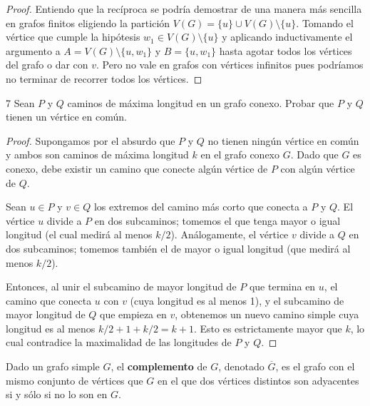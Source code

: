 \begin{proof}
    \vspace{0.1cm}

    Entiendo que la recíproca se podría demostrar de una manera más sencilla en grafos finitos eligiendo la partición \( V(G) = \{ u \} \cup V(G) \setminus \{ u \} \). Tomando el vértice que cumple la hipótesis \( w_1 \in V(G) \setminus \{ u \} \) y aplicando inductivamente el argumento a \( A = V(G) \setminus \{ u, w_1 \} \) y \( B = \{ u, w_1\} \) hasta agotar todos los vértices del grafo o dar con \( v \). Pero no vale en grafos con vértices infinitos pues podríamos no terminar de recorrer todos los vértices.
\end{proof}

\vspace{0.5cm}

\begin{ejercicio}{7}
    Sean \( P \) y \( Q \) caminos de máxima longitud en un grafo conexo. Probar que \( P \) y \( Q \) tienen un vértice en común.
\end{ejercicio}
\begin{proof}
    Supongamos por el absurdo que \( P \) y \( Q \) no tienen ningún vértice en común y ambos son caminos de máxima longitud \( k \) en el grafo conexo \( G \). Dado que \( G \) es conexo, debe existir un camino que conecte algún vértice de \( P \) con algún vértice de \( Q \).

    Sean \( u \in P \) y \( v \in Q \) los extremos del camino más corto que conecta a \( P \) y \( Q \). El vértice \( u \) divide a \( P \) en dos subcaminos; tomemos el que tenga mayor o igual longitud (el cual medirá al menos \( k/2 \)). Análogamente, el vértice \( v \) divide a \( Q \) en dos subcaminos; tomemos también el de mayor o igual longitud (que medirá al menos \( k/2 \)).

    Entonces, al unir el subcamino de mayor longitud de \( P \) que termina en \( u \), el camino que conecta \( u \) con \( v \) (cuya longitud es al menos 1), y el subcamino de mayor longitud de \( Q \) que empieza en \( v \), obtenemos un nuevo camino simple cuya longitud es al menos \( k/2 + 1 + k/2 = k + 1 \). Esto es estrictamente mayor que \( k \), lo cual contradice la maximalidad de las longitudes de \( P \) y \( Q \).
\end{proof}

\vspace{0.5cm}

\begin{definition}
    Dado un grafo simple \( G \), el \textbf{complemento} de \( G \), denotado \( \overline{G} \), es el grafo con el mismo conjunto de vértices que \( G \) en el que dos vértices distintos son adyacentes si y sólo si no lo son en \( G \).
\end{definition}

